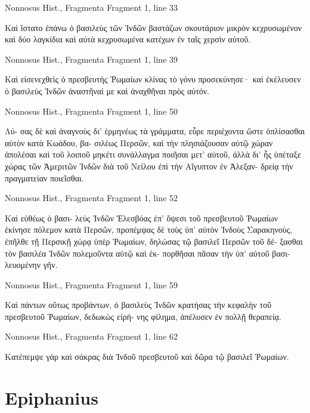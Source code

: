 \documentclass[12pt,letterpaper,twoside,final]{memoir}
\begin{document}
\begin{greek}
Nonnosus Hist., Fragmenta 
Fragment 1, line 33

                             Καὶ ἵστατο ἐπάνω ὁ βασιλεὺς 
τῶν Ἰνδῶν βαστάζων σκουτάριον μικρὸν κεχρυσωμένον 
καὶ δύο λαγκίδια καὶ αὐτὰ κεχρυσωμένα κατέχων ἐν 
ταῖς χερσὶν αὐτοῦ. 



Nonnosus Hist., Fragmenta 
Fragment 1, line 39

Καὶ εἰσενεχθεὶς ὁ πρεσβευτὴς Ῥωμαίων κλίνας τὸ 
γόνυ προσεκύνησε· καὶ ἐκέλευσεν ὁ βασιλεὺς Ἰνδῶν 
ἀναστῆναί με καὶ ἀναχθῆναι πρὸς αὐτόν. 



Nonnosus Hist., Fragmenta 
Fragment 1, line 50

                                                      Λύ-
σας δὲ καὶ ἀναγνοὺς δι' ἑρμηνέως τὰ γράμματα, εὗρε   
περιέχοντα ὥστε ὁπλίσασθαι αὐτὸν κατὰ Κωάδου, βα-
σιλέως Περσῶν, καὶ τὴν πλησιάζουσαν αὐτῷ χώραν 
ἀπολέσαι καὶ τοῦ λοιποῦ μηκέτι συνάλλαγμα ποιῆσαι 
μετ' αὐτοῦ, ἀλλὰ δι' ἧς ὑπέταξε χώρας τῶν Ἀμεριτῶν 
Ἰνδῶν διὰ τοῦ Νείλου ἐπὶ τὴν Αἴγυπτον ἐν Ἀλεξαν-
δρείᾳ τὴν πραγματείαν ποιεῖσθαι. 



Nonnosus Hist., Fragmenta 
Fragment 1, line 52

                                      Καὶ εὐθέως ὁ βασι-
λεὺς Ἰνδῶν Ἐλεσβόας 
ἐπ' ὄψεσι τοῦ πρεσβευτοῦ Ῥωμαίων 
ἐκίνησε πόλεμον κατὰ Περσῶν, προπέμψας δὲ τοὺς ὑπ' 
αὐτὸν Ἰνδοὺς Σαρακηνοὺς, ἐπῆλθε τῇ Περσικῇ χώρᾳ 
ὑπὲρ Ῥωμαίων, δηλώσας τῷ βασιλεῖ Περσῶν τοῦ δέ-
ξασθαι τὸν βασιλέα Ἰνδῶν πολεμοῦντα αὐτῷ καὶ ἐκ-
πορθῆσαι πᾶσαν τὴν ὑπ' αὐτοῦ βασιλευομένην γῆν. 



Nonnosus Hist., Fragmenta 
Fragment 1, line 59

                                                        Καὶ 
πάντων οὕτως προβάντων, ὁ βασιλεὺς Ἰνδῶν κρατήσας 
τὴν κεφαλὴν τοῦ πρεσβευτοῦ Ῥωμαίων, δεδωκὼς εἰρή-
νης φίλημα, ἀπέλυσεν ἐν πολλῇ θεραπείᾳ. 



Nonnosus Hist., Fragmenta 
Fragment 1, line 62

                                                Κατέπεμψε 
γὰρ καὶ σάκρας διὰ Ἰνδοῦ πρεσβευτοῦ καὶ δῶρα τῷ 
βασιλεῖ Ῥωμαίων. 
\end{greek}

\section{Epiphanius}%
\end{document}
